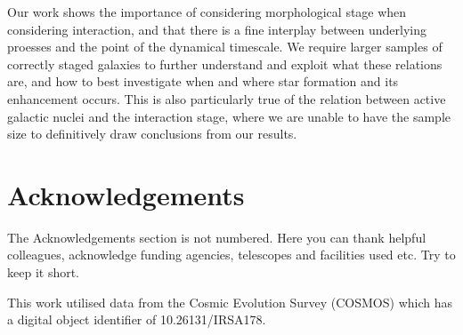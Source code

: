 Our work shows the importance of considering morphological stage when considering interaction, and that there is a fine interplay between underlying proesses and the point of the dynamical timescale. We require larger samples of correctly staged galaxies to further understand and exploit what these relations are, and how to best investigate when and where star formation and its enhancement occurs. This is also particularly true of the relation between active galactic nuclei and the interaction stage, where we are unable to have the sample size to definitively draw conclusions from our results.
 
\section*{Acknowledgements}
The Acknowledgements section is not numbered. Here you can thank helpful
colleagues, acknowledge funding agencies, telescopes and facilities used etc.
Try to keep it short.

This work utilised data from the Cosmic Evolution Survey (COSMOS) which has a digital object identifier of 10.26131/IRSA178.
